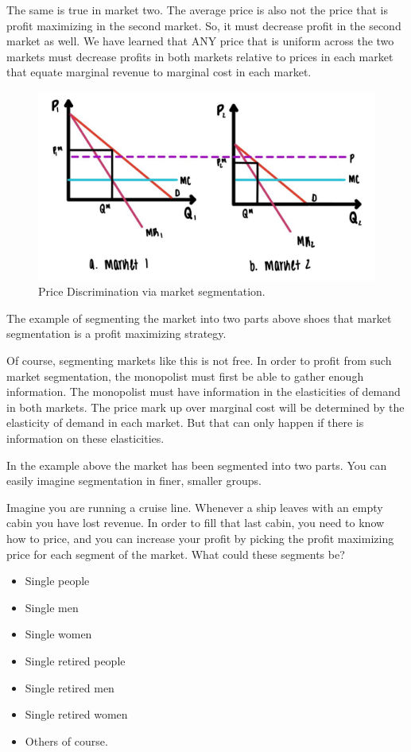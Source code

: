 \documentclass[
]{book}
\providecommand{\tightlist}{%
  \setlength{\itemsep}{0pt}\setlength{\parskip}{0pt}}
\begin{document}
The same is true in market two. The average price is also not the price that is profit maximizing in the second market. So, it must decrease profit in the second market as well.
We have learned that ANY price that is uniform across the two markets must decrease profits in both markets relative to prices in each market that equate marginal revenue to marginal cost in each market.

\begin{figure}

{\centering \includegraphics[width=0.5\linewidth]{img/ch6/fig7} 

}

\caption{Price Discrimination via market segmentation.}\label{fig:fig607}
\end{figure}

The example of segmenting the market into two parts above shoes that market segmentation is a profit maximizing strategy.

Of course, segmenting markets like this is not free. In order to profit from such market segmentation, the monopolist must first be able to gather enough information. The monopolist must have information in the elasticities of demand in both markets. The price mark up over marginal cost will be determined by the elasticity of demand in each market. But that can only happen if there is information on these elasticities.

In the example above the market has been segmented into two parts. You can easily imagine segmentation in finer, smaller groups.

Imagine you are running a cruise line. Whenever a ship leaves with an empty cabin you have lost revenue. In order to fill that last cabin, you need to know how to price, and you can increase your profit by picking the profit maximizing price for each segment of the market. What could these segments be?

\begin{itemize}
\tightlist
\item
  Single people
\item
  Single men
\item
  Single women
\item
  Single retired people
\item
  Single retired men
\item
  Single retired women
\item
  Others of course.
\end{itemize}
\end{document}
